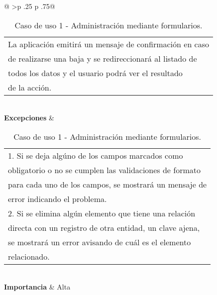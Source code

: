 \begin{table}[h]
\begin{tabular}{@{}
		>{}p {.25\textwidth} p {.75\textwidth}@{}}
\begin{tabular}[c]{@{}l@{}}
									    La aplicación emitirá un mensaje de confirmación en caso \\
									    de realizarse una baja y se redireccionará al listado de \\
									    todos los datos y el usuario podrá ver el resultado \\ 
									    de la acción. \\ 
								   \end{tabular} \\ \midrule
		\textbf{Excepciones}     & \begin{tabular}[c]{@{}l@{}}
										1. Si se deja algúno de los campos marcados como \\
										obligatorio o no se cumplen las validaciones de formato \\
										para cada uno de los campos, se mostrará un mensaje de \\
										error indicando el problema.\\ 
										2. Si se elimina algún elemento que tiene una relación \\
										directa con un registro de otra entidad, un clave ajena, \\
										se mostrará un error avisando de cuál es el elemento \\
										relacionado.
								   \end{tabular} \\ \midrule
		\textbf{Importancia}     & Alta \\ \bottomrule
	\end{tabular}
	\caption{Caso de uso 1 - Administración mediante formularios.}
\end{table}


